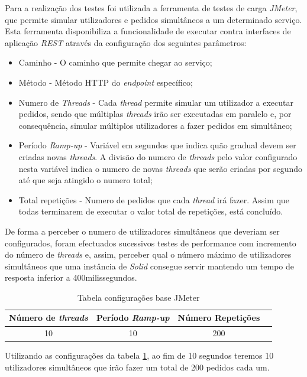 Para a realização dos testes foi utilizada a ferramenta de testes de carga \emph{JMeter}, que permite simular utilizadores e pedidos simultâneos a um determinado serviço. Esta ferramenta disponibiliza a funcionalidade de executar contra interfaces de aplicação \emph{\acrshort{REST}} através da configuração dos seguintes parâmetros:
\begin{itemize}
    \item Caminho - O caminho que permite chegar ao serviço;
    \item Método - Método HTTP do \emph{endpoint} específico;
    \item Numero de \emph{Threads} - Cada \emph{thread} permite simular um utilizador a executar pedidos, sendo que múltiplas \emph{threads} irão ser executadas em paralelo e, por consequência, simular múltiplos utilizadores a fazer pedidos em simultâneo;
    \item Período \emph{Ramp-up} - Variável em segundos que indica quão gradual devem ser criadas novas \emph{threads}. A divisão do numero de \emph{threads} pelo valor configurado nesta variável indica o numero de novas \emph{threads} que serão criadas por segundo até que seja atingido o numero total;
    \item Total repetições - Numero de pedidos que cada \emph{thread} irá fazer. Assim que todas terminarem de executar o valor total de repetições, está concluído.
\end{itemize}

De forma a perceber o numero de utilizadores simultâneos que deveriam ser configurados, foram efectuados sucessivos testes de performance com incremento do número de \emph{threads} e, assim, perceber qual o número máximo de utilizadores simultâneos que uma instância de \emph{Solid} consegue servir mantendo um tempo de resposta inferior a 400milissegundos.

\begin{table}[h]
\centering
\caption{Tabela configurações base JMeter}
\vspace{0.5cm}
\label{jmeter_configs}
\begin{tabular}{c|c|c|c} 
 Número de \emph{threads} & Período \emph{Ramp-up} & Número Repetições \\
\hline                          
10 & 10 & 200 \\
\end{tabular}
\end{table}

Utilizando as configurações da tabela \ref{jmeter_configs}, ao fim de 10 segundos teremos 10 utilizadores simultâneos que irão fazer um total de 200 pedidos cada um.

